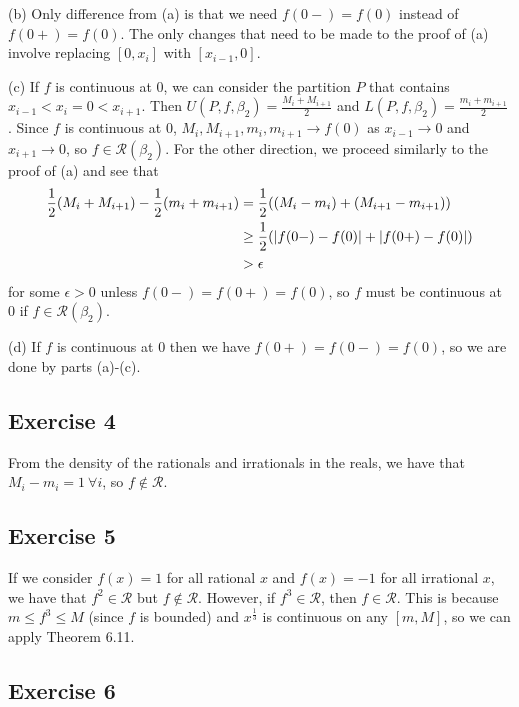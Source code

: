 (b) Only difference from (a) is that we need $f(0-) = f(0)$ instead of $f(0+) = f(0)$. The only changes that
need to be made to the proof of (a) involve replacing $[0, x_i]$ with $[x_{i-1}, 0]$.

(c) If $f$ is continuous at 0, we can consider the partition $P$ that contains $x_{i-1} < x_i = 0 < x_{i+1}$.
Then $U(P, f, \beta_2) = \frac{M_{i} + M_{i+1}}{2}$ and $L(P, f, \beta_2) = \frac{m_i + m_{i+1}}{2}$.
Since $f$ is continuous at 0, $M_i, M_{i+1}, m_i, m_{i+1} \to f(0)$ as $x_{i-1} \to 0$ and $x_{i+1} \to 0$,
so $f \in \mathscr{R}(\beta_2)$.
For the other direction, we proceed similarly to the proof of (a) and see that
\begin{align*}
        \frac{1}{2} (M_i + M_{i + 1}) - \frac{1}{2} (m_i + m_{i + 1}) &= \frac{1}{2} ((M_i - m_i) + (M_{i+1} - m_{i+1})) \\
                                                                      &\geq \frac{1}{2} (\abs{f(0-) - f(0)} + \abs{f(0+) - f(0)}) \\
                                                                      &> \epsilon
\end{align*}
for some $\epsilon > 0$ unless $f(0-) = f(0+) = f(0)$, so  $f$ must be continuous at 0 if  $f \in \mathscr{R}(\beta_2)$.

(d) If $f$ is continuous at 0 then we have $f(0+) = f(0-) = f(0)$, so we are done by parts (a)-(c).

\subsection{Exercise 4}
From the density of the rationals and irrationals in the reals, we have that $M_i - m_i = 1 \: \forall i$, so
$f \notin  \mathscr{R}$.

\subsection{Exercise 5}
If we consider $f(x) = 1$ for all rational $x$ and $f(x) = -1$ for all irrational $x$, we have that
$f^2 \in \mathscr{R}$ but $f \notin \mathscr{R}$. However, if $f^3 \in \mathscr{R}$, then $f \in \mathscr{R}$.
This is because $m \leq f^3 \leq M$ (since $f$ is bounded) and $x^{\frac{1}{3}}$ is continuous on any
$[m, M]$, so we can apply Theorem 6.11.

\subsection{Exercise 6}

